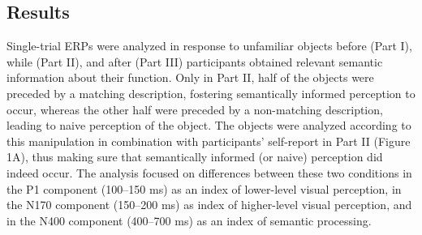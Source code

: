 \documentclass[
  english,
  man,11pt,floatsintext]{apa7}
\begin{document}
\hypertarget{results}{%
\subsection{Results}\label{results}}

Single-trial ERPs were analyzed in response to unfamiliar objects before (Part I), while (Part II), and after (Part III) participants obtained relevant semantic information about their function. Only in Part II, half of the objects were preceded by a matching description, fostering semantically informed perception to occur, whereas the other half were preceded by a non-matching description, leading to naive perception of the object. The objects were analyzed according to this manipulation in combination with participants' self-report in Part II (Figure 1A), thus making sure that semantically informed (or naive) perception did indeed occur. The analysis focused on differences between these two conditions in the P1 component (100--150 ms) as an index of lower-level visual perception, in the N170 component (150--200 ms) as index of higher-level visual perception, and in the N400 component (400--700 ms) as an index of semantic processing.
\end{document}
